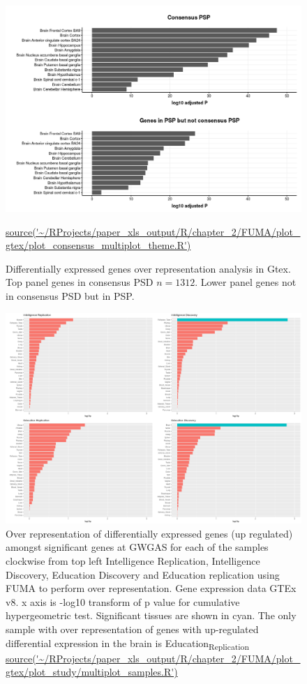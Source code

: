 \begin{figure}
    \centering
    \includegraphics[width=\textwidth]{images/chapter2/ggplot/gtex/Rplot_boxplot_FUMA_hPDF_PSP_theme.png}
    \caption{Differentially expressed genes over representation analysis in Gtex. Top panel genes in consensus PSD $n=1312$. Lower panel genes not in consensus PSD but in PSP.}
    \tiny\url{source('~/RProjects/paper_xls_output/R/chapter_2/FUMA/plot_gtex/plot_consensus_multiplot_theme.R')}
    \label{fig:deg_gtex_psp}
\end{figure}

\begin{figure}
    \centering
    \includegraphics[width=\textwidth]{images/chapter2/ggplot/ggplot_FUMA/Rplot_upregulated_general.png}
    \caption{Over representation of differentially expressed genes (up regulated) amongst significant genes at GWGAS for each of the samples clockwise from top left Intelligence Replication, Intelligence Discovery, Education Discovery and Education replication using FUMA to perform over representation. Gene expression data GTEx v8. x axis is -log10 transform of p value for cumulative hypergeometric test. Significant tissues are shown in cyan. The only sample with over representation of genes with up-regulated differential expression in the brain is Education\textsubscript{Replication} \url{source('~/RProjects/paper_xls_output/R/chapter_2/FUMA/plot_gtex/plot_study/multiplot_samples.R')}}
    \label{fig:deg_upref_sample_gtex_gener}
\end{figure}

